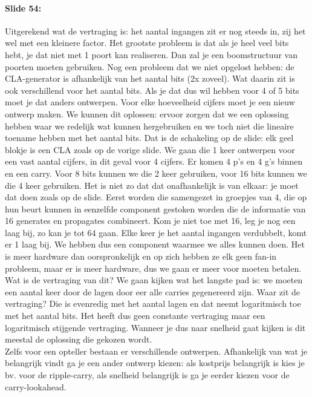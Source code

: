 \documentclass[10pt,a4paper]{book}
\begin{document}
\paragraph{Slide 54:} Uitgerekend wat de vertraging is: het aantal ingangen zit er nog steeds in, zij het wel met een kleinere factor. Het grootste probleem is dat als je heel veel bits hebt, je dat niet met 1 poort kan realiseren. Dan zal je een boomstructuur van poorten moeten gebruiken. Nog een probleem dat we niet opgelost hebben: de CLA-generator is afhankelijk van het aantal bits (2x zoveel). Wat daarin zit is ook verschillend voor het aantal bits. Als je dat dus wil hebben voor 4 of 5 bits moet je dat anders ontwerpen. Voor elke hoeveelheid cijfers moet je een nieuw ontwerp maken. We kunnen dit oplossen: ervoor zorgen dat we een oplossing hebben waar we redelijk wat kunnen hergebruiken en we toch niet die lineaire toename hebben met het aantal bits. Dat is de schakeling op de slide: elk geel blokje is een CLA zoals op de vorige slide. We gaan die 1 keer ontwerpen voor een vast aantal cijfers, in dit geval voor 4 cijfers. Er komen 4 p's en 4 g's binnen en een carry. Voor 8 bits kunnen we die 2 keer gebruiken, voor 16 bits kunnen we die 4 keer gebruiken. Het is niet zo dat dat onafhankelijk is van elkaar: je moet dat doen zoals op de slide. Eerst worden die samengezet in groepjes van 4, die op hun beurt kunnen in eenzelfde component gestoken worden die de informatie van 16 generates en propagates combineert. Kom je niet toe met 16, leg je nog een laag bij, zo kan je tot 64 gaan. Elke keer je het aantal ingangen verdubbelt, komt er 1 laag bij. We hebben dus een component waarmee we alles kunnen doen. Het is meer hardware dan oorspronkelijk en op zich hebben ze elk geen fan-in probleem, maar er is meer hardware, dus we gaan er meer voor moeten betalen. Wat is de vertraging van dit? We gaan kijken wat het langste pad is: we moeten een aantal keer door de lagen door eer alle carries gegenereerd zijn. Waar zit de vertraging? Die is evenredig met het aantal lagen en dat neemt logaritmisch toe met het aantal bits. Het heeft dus geen constante vertraging maar een logaritmisch stijgende vertraging. Wanneer je dus naar snelheid gaat kijken is dit meestal de oplossing die gekozen wordt.\\
Zelfs voor een opteller bestaan er verschillende ontwerpen. Afhankelijk van wat je belangrijk vindt ga je een ander ontwerp kiezen: als kostprijs belangrijk is kies je bv. voor de ripple-carry, als snelheid belangrijk is ga je eerder kiezen voor de carry-lookahead.
\end{document}
